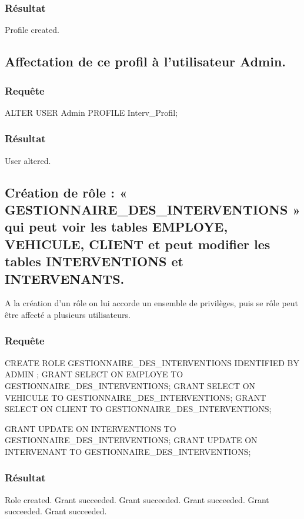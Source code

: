 \documentclass[•]{article}
\begin{document}
\subsubsection{Résultat}
\begin{sql}
Profile created.
\end{sql}


\subsection{Affectation de ce profil à l’utilisateur Admin.}
\subsubsection{Requête}
\begin{sql}
ALTER USER Admin PROFILE Interv_Profil;
\end{sql}

\subsubsection{Résultat}
\begin{sql}
User altered.
\end{sql}

\subsection{Création de rôle : « GESTIONNAIRE\_DES\_INTERVENTIONS » qui peut voir les tables EMPLOYE, VEHICULE, CLIENT et peut modifier les tables INTERVENTIONS et INTERVENANTS.}

\textrm{A la création d'un rôle on lui accorde un ensemble de privilèges, puis se rôle peut être affecté a plusieurs utilisateurs. }
\subsubsection{Requête}

\begin{sql}
CREATE ROLE GESTIONNAIRE_DES_INTERVENTIONS IDENTIFIED BY ADMIN ;
	GRANT SELECT ON EMPLOYE TO GESTIONNAIRE_DES_INTERVENTIONS;
	GRANT SELECT ON VEHICULE TO GESTIONNAIRE_DES_INTERVENTIONS;
	GRANT SELECT ON CLIENT TO GESTIONNAIRE_DES_INTERVENTIONS;

	GRANT UPDATE ON INTERVENTIONS TO GESTIONNAIRE_DES_INTERVENTIONS;
	GRANT UPDATE ON INTERVENANT TO GESTIONNAIRE_DES_INTERVENTIONS;
\end{sql}

\subsubsection{Résultat}
\begin{sql}
Role created.
Grant succeeded.
Grant succeeded.
Grant succeeded.
Grant succeeded.
Grant succeeded.
\end{sql}
\end{document}
